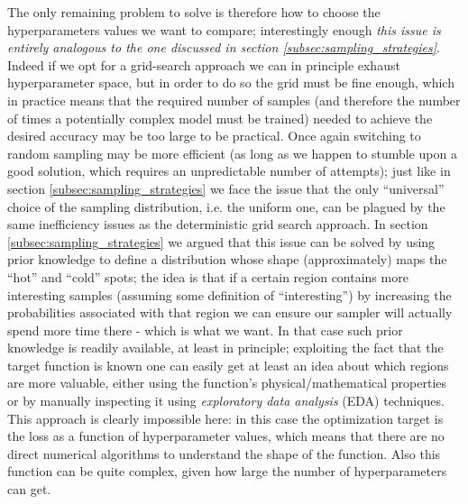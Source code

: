 The only remaining problem to solve is therefore how to choose the hyperparameters values we want to compare; interestingly enough \emph{this issue is entirely analogous to the one discussed in section \ref{subsec:sampling_strategies}}. Indeed if we opt for a grid-search approach we can in principle exhaust hyperparameter space, but in order to do so the grid must be fine enough, which in practice means that the required number of samples (and therefore the number of times a potentially complex model must be trained) needed to achieve the desired accuracy may be too large to be practical.
Once again switching to random sampling may be more efficient (as long as we happen to stumble upon a good solution, which requires an unpredictable number of attempts); just like in section \ref{subsec:sampling_strategies} we face the issue that the only ``universal'' choice of the sampling distribution, i.e. the uniform one, can be plagued by the same inefficiency issues as the deterministic grid search approach.
In section \ref{subsec:sampling_strategies} we argued that this issue can be solved by using prior knowledge to define a distribution whose shape (approximately) maps the ``hot'' and ``cold'' spots; the idea is that if a certain region contains more interesting samples (assuming some definition of ``interesting'') by increasing the probabilities associated with that region we can ensure our sampler will actually spend more time there - which is what we want.
In that case such prior knowledge is readily available, at least in principle; exploiting the fact that the target function is known one can easily get at least an idea about which regions are more valuable, either using the function's physical/mathematical properties or by manually inspecting it using \emph{exploratory data analysis} (EDA) techniques.
This approach is clearly impossible here: in this case the optimization target is the loss as a function of hyperparameter values, which means that there are no direct numerical algorithms to understand the shape of the function. Also this function can be quite complex, given how large the number of hyperparameters can get.

